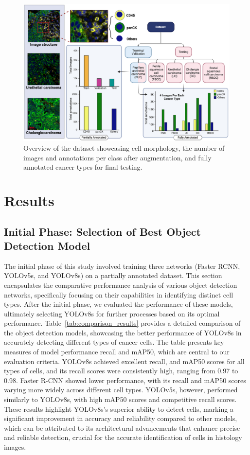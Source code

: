 \documentclass{midl} %
\begin{document}
\begin{figure}[!htbp]
\centering
\includegraphics[width=0.8\linewidth]{images/2.png}
\caption{Overview of the dataset showcasing cell morphology, the number of images and annotations per class after augmentation, and fully annotated cancer types for final testing.}
\label{fig:2}
\end{figure}
\vspace{-1em}

\section{Results}
\subsection{Initial Phase: Selection of Best Object Detection Model}
The initial phase of this study involved training three networks (Faster RCNN, YOLOv5s, and YOLOv8s) on a partially annotated dataset. This section encapsulates the comparative performance analysis of various object detection networks, specifically focusing on their capabilities in identifying distinct cell types. After the initial phase, we evaluated the performance of these models, ultimately selecting YOLOv8s for further processes based on its optimal performance. Table~\ref{tab:comparison_results} provides a detailed comparison of the object detection models, showcasing the better performance of YOLOv8s in accurately detecting different types of cancer cells. The table presents key measures of model performance recall and mAP50, which are central to our evaluation criteria. YOLOv8s achieved excellent recall, and mAP50 scores for all types of cells, and its recall scores were consistently high, ranging from 0.97 to 0.98. Faster R-CNN showed lower performance, with its recall and mAP50 scores varying more widely across different cell types. YOLOv5s, however, performed similarly to YOLOv8s, with high mAP50 scores and competitive recall scores. These results highlight YOLOv8s’s superior ability to detect cells, marking a significant improvement in accuracy and reliability compared to other models, which can be attributed to its architectural advancements \cite{ultralytics2023} that enhance precise and reliable detection, crucial for the accurate identification of cells in histology images.
\end{document}
